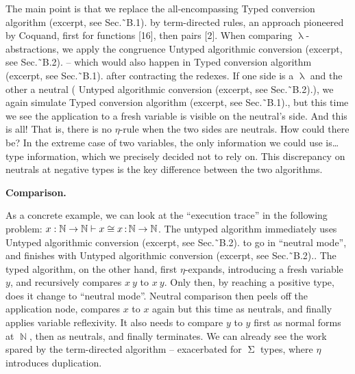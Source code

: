 \documentclass[10pt,a4paper]{amsart}
\begin{document}
 
 
The main point is that we replace the all-encompassing   Typed conversion algorithm (excerpt, see Sec.˜B.1). by term-directed rules, an approach pioneered by Coquand, first for functions [16], then pairs [2]. When comparing $\operatorname{\lambda}$-abstractions, we apply the congruence   Untyped algorithmic conversion (excerpt, see Sec.˜B.2). – which would also happen in   Typed conversion algorithm (excerpt, see Sec.˜B.1). after contracting the redexes. If one side is a $\operatorname{\lambda}$ and the other a neutral (  Untyped algorithmic conversion (excerpt, see Sec.˜B.2).), we again simulate   Typed conversion algorithm (excerpt, see Sec.˜B.1)., but this time we see the application to a fresh variable is visible on the neutral’s side. And this is all! That is, there is no $\eta$-rule when the two sides are neutrals. How could there be? In the extreme case of two variables, the only information we could use is… type information, which we precisely decided not to rely on. This discrepancy on neutrals at negative types is the key difference between the two algorithms.\par
 
 
 
 
\par\medskip\noindent\textbf{Comparison.}\par
 
 
As a concrete example, we can look at the “execution trace” in the following problem: $x:\operatorname{\mathbb{N}}\to\operatorname{\mathbb{N}}\vdash x\mathrel{%
\raisebox{-0.5pt}{$\cong$}}x\operatorname{\mathrel{:}}\operatorname{\mathbb{N}%
}\to\operatorname{\mathbb{N}}$. The untyped algorithm immediately uses   Untyped algorithmic conversion (excerpt, see Sec.˜B.2). to go in “neutral mode”, and finishes with   Untyped algorithmic conversion (excerpt, see Sec.˜B.2).. The typed algorithm, on the other hand, first $\eta$-expands, introducing a fresh variable $y$, and recursively compares $x\ y$ to $x\ y$. Only then, by reaching a positive type, does it change to “neutral mode”. Neutral comparison then peels off the application node, compares $x$ to $x$ again but this time as neutrals, and finally applies variable reflexivity. It also needs to compare $y$ to $y$ first as normal forms at $\operatorname{\mathbb{N}}$, then as neutrals, and finally terminates. We can already see the work spared by the term-directed algorithm – exacerbated for $\operatorname{\Sigma}$ types, where $\eta$ introduces duplication.\par
 
\end{document}
